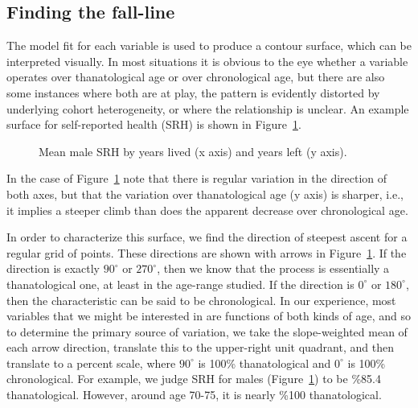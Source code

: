\documentclass{article}
\begin{document}
\subsection{Finding the fall-line}
The model fit for each variable is used to produce a contour surface, which can
be interpreted visually. In most situations it is obvious to the eye whether a
variable operates over thanatological age or over chronological age, but there
are also some instances where both are at play, the pattern is evidently
distorted by underlying cohort heterogeneity, or where the relationship is
unclear. An example surface for self-reported health (SRH) is shown in
Figure~\ref{fig:srh}.

\begin{figure}[!h]
    \centering
    \caption{Mean male SRH by years lived (x axis) and years left (y axis).}
    \label{fig:srh}
	\vspace{-2em}
\end{figure}

In the case of Figure~\ref{fig:srh} note that there is regular variation in the
direction of both axes, but that the variation over thanatological age (y axis)
is sharper, i.e., it implies a steeper climb than does the apparent decrease
over chronological age. 

In order to characterize this surface, we find the direction
of steepest ascent for a regular grid of points. These directions are shown with
arrows in Figure~\ref{fig:srh}. If the direction is exactly $90^\circ$ or $270^\circ$,
then we know that the process is essentially a thanatological one, at least in
the age-range studied. If the direction is $0^\circ$ or $180^\circ$, then the
characteristic can be said to be chronological. In our experience, most
variables that we might be interested in are functions of both kinds of age, and
so to determine the primary source of variation, we take the slope-weighted mean
of each arrow direction, translate this to the upper-right unit quadrant, and
then translate to a percent scale, where $90^\circ$ is 100\% thanatological and
$0^\circ$ is 100\% chronological. For example, we judge SRH for males
(Figure~\ref{fig:srh}) to be \%85.4 thanatological. However, around age 70-75,
it is nearly \%100 thanatological.
\end{document}
